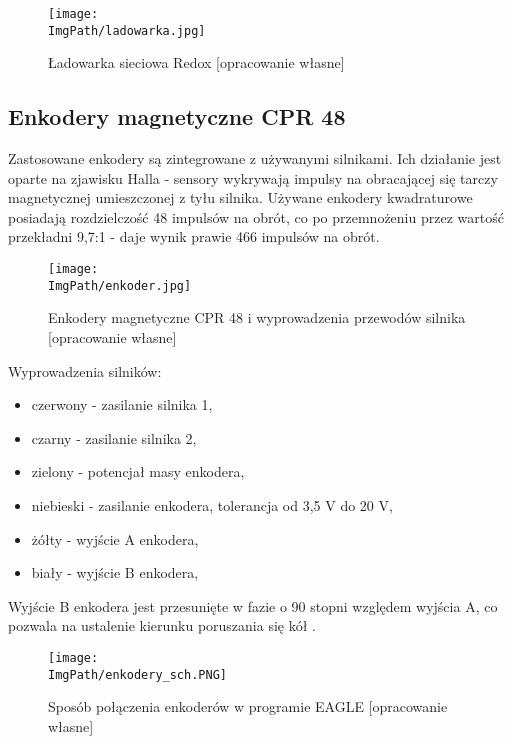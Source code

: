 \documentclass[a4paper,12pt,twoside,openany]{report}
\newcommand{\ImgPath}{.}
\begin{document}
\begin{figure}[!htbp]
	\begin{center}
\centering
\texttt{[image: \\ImgPath/ladowarka.jpg]}
\end{center}
	\caption{Ładowarka sieciowa Redox [opracowanie własne]}
	\label{schematKomunikacji}
\end{figure}

\subsection{Enkodery magnetyczne CPR 48}

Zastosowane enkodery są zintegrowane z używanymi silnikami. Ich działanie jest oparte na zjawisku Halla - sensory wykrywają impulsy na obracającej się tarczy magnetycznej umieszczonej z tyłu silnika. Używane enkodery kwadraturowe posiadają rozdzielczość 48 impulsów na obrót, co po przemnożeniu przez wartość przekładni 9,7:1 - daje wynik prawie 466 impulsów na obrót.

\begin{figure}[!htbp]
	\begin{center}
\centering
\texttt{[image: \\ImgPath/enkoder.jpg]}
\end{center}
	\caption{Enkodery magnetyczne CPR 48 i wyprowadzenia przewodów silnika [opracowanie własne]}
	\label{schematKomunikacji}
\end{figure}

\noindent Wyprowadzenia silników:
\begin{itemize}
\item czerwony - zasilanie silnika 1,
\item czarny - zasilanie silnika 2,
\item zielony - potencjał masy enkodera,
\item niebieski - zasilanie enkodera, tolerancja od 3,5 V do 20 V,
\item żółty - wyjście A enkodera,
\item biały - wyjście B enkodera,
\end{itemize}

\noindent Wyjście B enkodera jest przesunięte w fazie o 90 stopni względem wyjścia A, co pozwala na ustalenie kierunku poruszania się kół \cite{pololu}.

\begin{figure}[!htbp]
	\begin{center}
\centering
\texttt{[image: \\ImgPath/enkodery\_sch.PNG]}
\end{center}
	\caption{Sposób połączenia enkoderów w programie EAGLE [opracowanie własne]}
	\label{schematKomunikacji}
\end{figure}
\end{document}
